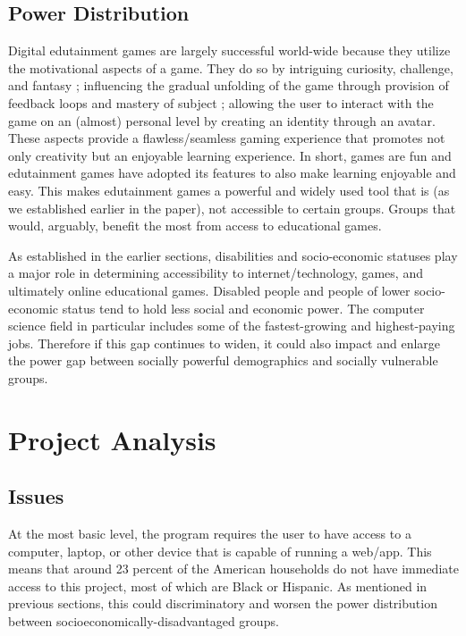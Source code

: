 \documentclass[10pt,twocolumn]{article}
\begin{document}
\subsection{Power Distribution}
    Digital edutainment games are largely successful world-wide because they utilize the motivational aspects of a game. They do so by intriguing curiosity, challenge, and fantasy \cite{malone1981makes}; influencing the gradual unfolding of the game through provision of feedback loops and mastery of subject \cite{qin2009measuring,}; allowing the user to interact with the game on an (almost) personal level by creating an identity through an avatar. \cite{blascovich2011infinite} These aspects provide a flawless/seamless gaming experience that promotes not only creativity but an enjoyable learning experience. In short, games are fun and edutainment games have adopted its features to also make learning enjoyable and easy. This makes edutainment games a powerful and widely used tool that is (as we established earlier in the paper), not accessible to certain groups. Groups that would, arguably, benefit the most from access to educational games.

    As established in the earlier sections, disabilities and socio-economic statuses play a major role in determining accessibility to internet/technology, games, and ultimately online educational games. Disabled people and people of lower socio-economic status tend to hold less social and economic power. The computer science field in particular includes some of the fastest-growing and highest-paying jobs. Therefore if this gap continues to widen, it could also impact and enlarge the power gap between socially powerful demographics and socially vulnerable groups. 



\section{Project Analysis}
\subsection{Issues}

    At the most basic level, the program requires the user to have access to a computer, laptop, or other device that is capable of running a web/app. This means that around 23 percent of the American households do not have immediate access to this project, most of which are Black or Hispanic. As mentioned in previous sections, this could discriminatory and worsen the power distribution between socioeconomically-disadvantaged groups.
\end{document}
